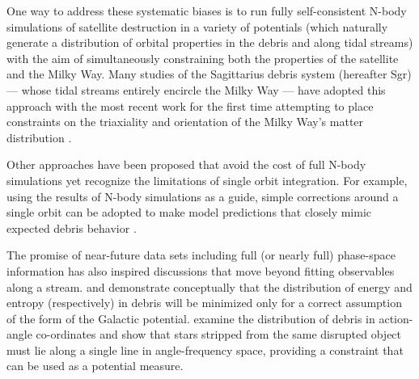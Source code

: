 \documentclass[preprint]{aastex}
\begin{document}
One way to address these systematic biases is to run fully self-consistent N-body simulations of satellite destruction in a variety of potentials (which naturally generate a
distribution of orbital properties in the debris and along tidal streams) with the aim of simultaneously constraining both the properties of the satellite and the Milky Way.
Many studies of the Sagittarius debris system (hereafter Sgr) --- whose tidal streams entirely encircle the Milky Way --- have adopted this approach \citep[e.g.][]
{law05,fellhauer06} with the most recent work for the first time attempting to place constraints on the triaxiality and orientation of the Milky Way's matter distribution
\citep{law10}.

Other approaches have been proposed that avoid the cost of full N-body simulations yet recognize the limitations of single orbit integration.
For example, using the results of N-body simulations as a guide, simple corrections around a single orbit can be adopted to make model predictions that closely
mimic expected debris behavior \citep[e.g.][]{johnston99b,varghese11}.

The promise of near-future data sets including full (or nearly full) phase-space information has also inspired discussions that move beyond fitting observables along a
stream.
\citet{binney08} and \citet{penarrubia12} demonstrate conceptually that the distribution of energy and entropy (respectively) in debris will be minimized only for a correct
assumption of the form of the Galactic potential.
\citet{sanders13b} examine the distribution of debris in action-angle co-ordinates and show that stars stripped from the same disrupted object must lie along a single line in angle-frequency space, providing a constraint that can be used as a potential measure.
\end{document}
